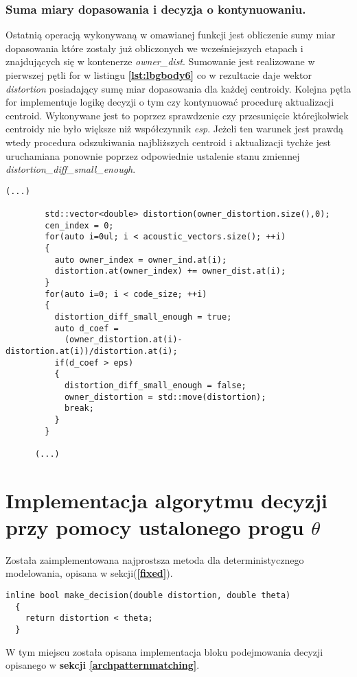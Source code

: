 \subsubsection{Suma miary dopasowania i decyzja o kontynuowaniu.}
Ostatnią operacją wykonywaną w omawianej funkcji jest obliczenie sumy miar dopasowania które zostały już obliczonych we wcześniejszych etapach i znajdujących się w kontenerze \textit{owner\_dist}. Sumowanie jest realizowane w pierwszej pętli for w listingu \textbf{\ref{lst:lbgbody6}} co w rezultacie daje wektor \textit{distortion} posiadający sumę miar dopasowania dla każdej centroidy. Kolejna pętla for implementuje logikę decyzji o tym czy kontynuować procedurę aktualizacji centroid. Wykonywane jest to poprzez sprawdzenie czy przesunięcie którejkolwiek centroidy nie było większe niż współczynnik \textit{esp}. Jeżeli ten warunek jest prawdą wtedy procedura odszukiwania najbliższych centroid i aktualizacji tychże jest uruchamiana ponownie poprzez odpowiednie ustalenie stanu zmiennej \textit{distortion\_diff\_small\_enough}.
\begin{lstlisting}[style=lst:cpp, caption=Funkcja \textit{lbg}\label{lst:lbgbody6} - decyzja o kontynuowaniu]
      (...)

        std::vector<double> distortion(owner_distortion.size(),0);
        cen_index = 0;
        for(auto i=0ul; i < acoustic_vectors.size(); ++i)
        {
          auto owner_index = owner_ind.at(i);
          distortion.at(owner_index) += owner_dist.at(i);
        }
        for(auto i=0; i < code_size; ++i)
        {
          distortion_diff_small_enough = true;
          auto d_coef =
            (owner_distortion.at(i)-distortion.at(i))/distortion.at(i); 
          if(d_coef > eps)
          {
            distortion_diff_small_enough = false;
            owner_distortion = std::move(distortion);
            break;
          }
        }

      (...)
\end{lstlisting}

\section{Implementacja algorytmu decyzji przy pomocy ustalonego progu $\theta$}

Została zaimplementowana najprostsza metoda dla deterministycznego modelowania, opisana w sekcji(\textbf{\ref{fixed}}).

\begin{lstlisting}[style=lst:cpp, caption=Funkcja \textit{make\_decision}\label{lst:dec} - decyzja o kontynuowaniu]
  inline bool make_decision(double distortion, double theta)
  {
    return distortion < theta;
  }

\end{lstlisting}

W tym miejscu została opisana implementacja bloku podejmowania decyzji opisanego w \textbf{sekcji \ref{archpatternmatching}}.
